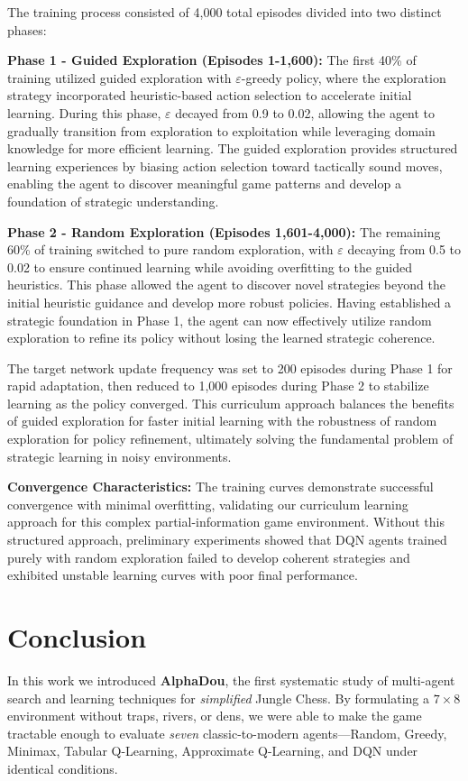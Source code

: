 \documentclass{article}
\begin{document}
The training process consisted of 4,000 total episodes divided into two distinct phases:

\textbf{Phase 1 - Guided Exploration (Episodes 1-1,600):} The first 40\% of training utilized guided exploration with $\varepsilon$-greedy policy, where the exploration strategy incorporated heuristic-based action selection to accelerate initial learning. During this phase, $\varepsilon$ decayed from 0.9 to 0.02, allowing the agent to gradually transition from exploration to exploitation while leveraging domain knowledge for more efficient learning. The guided exploration provides structured learning experiences by biasing action selection toward tactically sound moves, enabling the agent to discover meaningful game patterns and develop a foundation of strategic understanding.

\textbf{Phase 2 - Random Exploration (Episodes 1,601-4,000):} The remaining 60\% of training switched to pure random exploration, with $\varepsilon$ decaying from 0.5 to 0.02 to ensure continued learning while avoiding overfitting to the guided heuristics. This phase allowed the agent to discover novel strategies beyond the initial heuristic guidance and develop more robust policies. Having established a strategic foundation in Phase 1, the agent can now effectively utilize random exploration to refine its policy without losing the learned strategic coherence.

The target network update frequency was set to 200 episodes during Phase 1 for rapid adaptation, then reduced to 1,000 episodes during Phase 2 to stabilize learning as the policy converged. This curriculum approach balances the benefits of guided exploration for faster initial learning with the robustness of random exploration for policy refinement, ultimately solving the fundamental problem of strategic learning in noisy environments.

\textbf{Convergence Characteristics:} The training curves demonstrate successful convergence with minimal overfitting, validating our curriculum learning approach for this complex partial-information game environment. Without this structured approach, preliminary experiments showed that DQN agents trained purely with random exploration failed to develop coherent strategies and exhibited unstable learning curves with poor final performance.



\section{Conclusion}
In this work we introduced \textbf{AlphaDou}, the first systematic study of multi-agent search and learning techniques for \emph{simplified} Jungle Chess.  
By formulating a $7{\times}8$ environment without traps, rivers, or dens, we were able to make the game tractable enough to evaluate \emph{seven} classic-to-modern agents—Random, Greedy, Minimax, Tabular Q-Learning, Approximate Q-Learning, and DQN under identical conditions.
\end{document}
